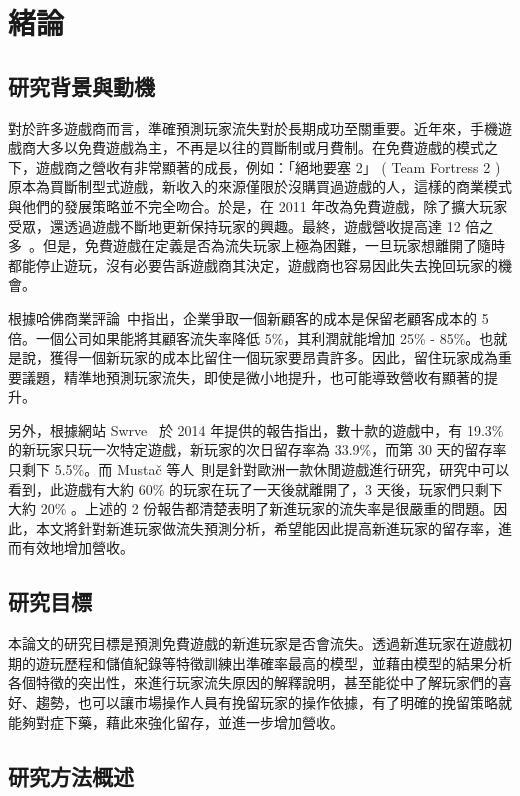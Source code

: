 \chapter{緒論}

\section{研究背景與動機}

對於許多遊戲商而言，準確預測玩家流失對於長期成功至關重要。近年來，手機遊戲商大多以免費遊戲為主，不再是以往的買斷制或月費制。在免費遊戲的模式之下，遊戲商之營收有非常顯著的成長，例如：「絕地要塞 2」 ( Team Fortress 2 ) 原本為買斷制型式遊戲，新收入的來源僅限於沒購買過遊戲的人，這樣的商業模式與他們的發展策略並不完全吻合。於是，在 2011 年改為免費遊戲，除了擴大玩家受眾，還透過遊戲不斷地更新保持玩家的興趣。最終，遊戲營收提高達 12 倍之多~\cite{miller2012gdc}。但是，免費遊戲在定義是否為流失玩家上極為困難，一旦玩家想離開了隨時都能停止遊玩，沒有必要告訴遊戲商其決定，遊戲商也容易因此失去挽回玩家的機會。

根據哈佛商業評論~\cite{HarvardBusiness}中指出，企業爭取一個新顧客的成本是保留老顧客成本的 5 倍。一個公司如果能將其顧客流失率降低 5\%，其利潤就能增加 25\% - 85\%。也就是說，獲得一個新玩家的成本比留住一個玩家要昂貴許多。因此，留住玩家成為重要議題，精準地預測玩家流失，即使是微小地提升，也可能導致營收有顯著的提升。

另外，根據網站 Swrve~\cite{SwrveNewPlayerReport} 於 2014 年提供的報告指出，數十款的遊戲中，有 19.3\% 的新玩家只玩一次特定遊戲，新玩家的次日留存率為 33.9\%，而第 30 天的留存率只剩下 5.5\%。而 Mustač 等人~\cite{SupervisedMachineLearning}則是針對歐洲一款休閒遊戲進行研究，研究中可以看到，此遊戲有大約 60\% 的玩家在玩了一天後就離開了，3 天後，玩家們只剩下大約 20\% 。上述的 2 份報告都清楚表明了新進玩家的流失率是很嚴重的問題。因此，本文將針對新進玩家做流失預測分析，希望能因此提高新進玩家的留存率，進而有效地增加營收。

\section{研究目標}

本論文的研究目標是預測免費遊戲的新進玩家是否會流失。透過新進玩家在遊戲初期的遊玩歷程和儲值紀錄等特徵訓練出準確率最高的模型，並藉由模型的結果分析各個特徵的突出性，來進行玩家流失原因的解釋說明，甚至能從中了解玩家們的喜好、趨勢，也可以讓市場操作人員有挽留玩家的操作依據，有了明確的挽留策略就能夠對症下藥，藉此來強化留存，並進一步增加營收。

\section{研究方法概述}

